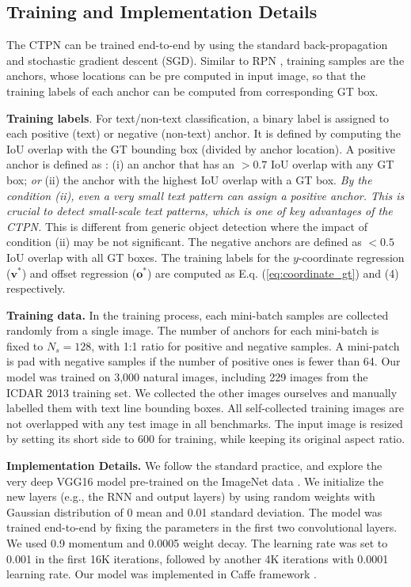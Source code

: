 \documentclass[runningheads]{llncs}
\begin{document}
\subsection{Training and Implementation Details}
The CTPN can be trained end-to-end by using the standard back-propagation and stochastic gradient descent (SGD). Similar to RPN \cite{Ren2015}, training samples are the anchors, whose locations can be pre computed in input image, so that the training labels of each anchor can be computed from corresponding GT box.

\textbf{Training labels}.  For text/non-text classification,  a binary label is assigned to each positive (text) or negative (non-text) anchor. It is defined by computing the IoU overlap with the GT bounding box (divided by anchor location). A positive anchor is defined as : (i) an anchor that has an $>0.7$ IoU overlap with any GT box; \textit{or} (ii) the anchor with the highest IoU overlap with a GT box. \textit{By the condition (ii), even a very small text pattern can assign a positive anchor. This is crucial to detect small-scale text patterns, which is one of key advantages of the CTPN. } This is different from generic object detection where the impact of condition (ii) may be not significant. The negative anchors are defined as $<0.5$ IoU overlap with all GT boxes. The training labels for the $y$-coordinate regression ($\textbf{v}^*$) and offset regression  ($\textbf{o}^*$) are computed as E.q. (\ref{eq:coordinate_gt}) and (4) respectively.

\textbf{Training data.} In the training process, each mini-batch samples are collected randomly from a single image. The number of anchors for each mini-batch is fixed to  $N_s=128$, with 1:1 ratio for positive and negative samples. A mini-patch is pad with negative samples if the number of positive ones is fewer than 64. Our model was trained on 3,000 natural images, including 229 images from the ICDAR 2013 training set. We collected the other images ourselves and manually labelled them with text line bounding boxes. All self-collected training images are not overlapped with any test image in all benchmarks.  The input image is resized by setting its short side to 600 for training, while keeping its original aspect ratio.

\textbf{Implementation Details.} We follow the standard practice,  and explore the  very deep VGG16 model \cite{Simonyan2015} pre-trained on the ImageNet data \cite{Russakovsky2015}. We initialize the new layers (e.g., the RNN and output layers) by using random weights with Gaussian distribution of 0 mean and 0.01 standard deviation.  The model was trained end-to-end by fixing the parameters in the first two convolutional layers. We used 0.9 momentum and 0.0005 weight decay. The learning rate was set to 0.001 in the first 16K iterations, followed by another 4K iterations with 0.0001 learning rate. Our model was implemented in Caffe framework \cite{Jia2014}.
\end{document}
